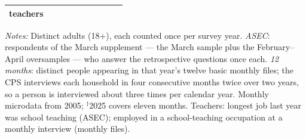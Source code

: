 \documentclass[11pt]{article}
\begin{document}
\begin{center}
\begin{threeparttable}
\begin{tabular}{l rr rr @{\hskip 1.3em} l rr rr}
{teachers} \\
\bottomrule
\end{tabular}
\begin{tablenotes}[flushleft]
\footnotesize
\item \emph{Notes:} Distinct adults (18+), each counted once per survey
year. \emph{ASEC}: respondents of the March supplement --- the March
sample plus the February--April oversamples --- who answer the
retrospective questions once each. \emph{12 months}: distinct
people appearing in that year's twelve basic monthly files; the CPS
interviews each household in four consecutive months twice over two
years, so a person is interviewed about three times per calendar year.
Monthly microdata from 2005; $^{\dagger}$2025 covers eleven months.
Teachers: longest job last year was school teaching (ASEC); employed in
a school-teaching occupation at a monthly interview (monthly files).
\end{tablenotes}
\end{threeparttable}
\end{center}

\clearpage
\end{document}
